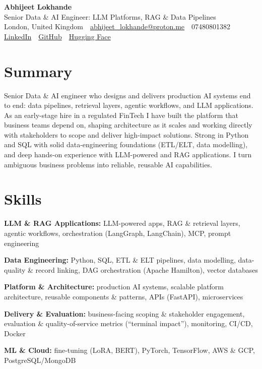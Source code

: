 \documentclass[10pt,a4paper]{article}
\newcommand{\sep}{\,\textcolor{accent!60}{\textbar}\,}
\begin{document}
\begin{center}
  {\fontsize{24}{26}\selectfont\bfseries Abhijeet Lokhande}\\[3pt]
  {\color{accent}\large Senior Data \& AI Engineer: LLM Platforms, RAG \& Data Pipelines}\\[5pt]
  {\small
    London, United Kingdom \sep
    \href{mailto:abhijeet_lokhande@proton.me}{abhijeet\_lokhande@proton.me} \sep
    07480801382 \\[2pt]
    \href{https://www.linkedin.com/in/ablds/}{LinkedIn} \sep
    \href{https://github.com/abhijeetscode}{GitHub} \sep
    \href{https://huggingface.co/ab-ai}{Hugging Face}
  }
\end{center}
\vspace{2pt}

\section{Summary}
Senior Data \& AI engineer who designs and delivers production AI systems end to end: data pipelines, retrieval layers, agentic workflows, and LLM applications. As an early-stage hire in a regulated FinTech I have built the platform that business teams depend on, shaping architecture as it scales and working directly with stakeholders to scope and deliver high-impact solutions. Strong in Python and SQL with solid data-engineering foundations (ETL/ELT, data modelling), and deep hands-on experience with LLM-powered and RAG applications. I turn ambiguous business problems into reliable, reusable AI capabilities.

\section{Skills}
\begin{tight}
  \item[\textcolor{accent}{\small$\bullet$}] \textbf{LLM \& RAG Applications:} LLM-powered apps, RAG \& retrieval layers, agentic workflows, orchestration (LangGraph, LangChain), MCP, prompt engineering
  \item[\textcolor{accent}{\small$\bullet$}] \textbf{Data Engineering:} Python, SQL, ETL \& ELT pipelines, data modelling, data-quality \& record linking, DAG orchestration (Apache Hamilton), vector databases
  \item[\textcolor{accent}{\small$\bullet$}] \textbf{Platform \& Architecture:} production AI systems, scalable platform architecture, reusable components \& patterns, APIs (FastAPI), microservices
  \item[\textcolor{accent}{\small$\bullet$}] \textbf{Delivery \& Evaluation:} business-facing scoping \& stakeholder engagement, evaluation \& quality-of-service metrics (``terminal impact''), monitoring, CI/CD, Docker
  \item[\textcolor{accent}{\small$\bullet$}] \textbf{ML \& Cloud:} fine-tuning (LoRA, BERT), PyTorch, TensorFlow, AWS \& GCP, PostgreSQL/MongoDB
\end{tight}
\end{document}
